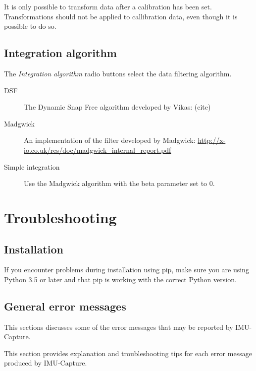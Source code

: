 \documentclass[11pt,letterpaper,article,oneside]{memoir}
\newcommand{\name}{IMU-Capture}
\begin{document}
It is only possible to transform data after a calibration has been set.
Transformations should not be applied to callibration data, even though it is
possible to do so.


\section{Integration algorithm}

The \emph{Integration algorithm} radio buttons select the data filtering
algorithm.

\begin{description}

\item[DSF]
The Dynamic Snap Free algorithm developed by Vikas: (cite)
\item[Madgwick] \hfill
An implementation of the filter developed by Madgwick: 
\url{http://x-io.co.uk/res/doc/madgwick_internal_report.pdf}
\item[Simple integration] \hfill
Use the Madgwick algorithm with the beta parameter set to 0.

\end{description}


\chapter{Troubleshooting}

\section{Installation}

If you encounter problems during installation using pip, make sure you are using
Python 3.5 or later and that pip is working with the correct Python version.


\section{General error messages}

This sections discusses some of the error messages that may be reported by
\name{}.


\newcommand{\genericFix}{Try resetting the Arduino.  Make sure that the Arduino
is correctly powered and connected to the PC (Section \ref{sec:wiring}), and
that the correct code is installed on the Arduino (Section
\ref{sec:installarduinocode}).}

This section provides explanation and troubleshooting tips for each error
message produced by \name{}.
\end{document}
